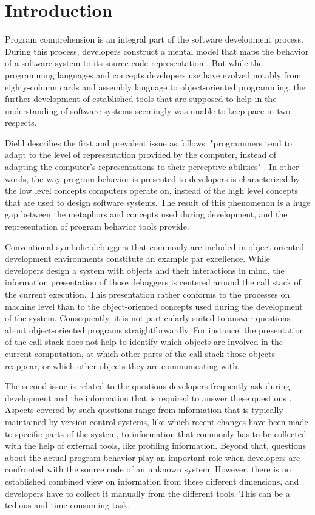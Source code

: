 \chapter{Introduction}
\label{c:introduction}

Program comprehension is an integral part of the software development process.
During this process, developers construct a mental model that maps the behavior of a software system to its source code representation \cite{latoza_maintaining_2006}.
But while the programming languages and concepts developers use have evolved notably from eighty-column cards and assembly language to object-oriented programming, the further development of established tools that are supposed to help in the understanding of software systems seemingly was unable to keep pace in two respects.

Diehl describes the first and prevalent issue as follows: "programmers tend to adapt to the level of representation provided by the computer, instead of adapting the computer's representations to their perceptive abilities" \cite{diehl_software_2007}.
In other words, the way program behavior is presented to developers is characterized by the low level concepts computers operate on, instead of the high level concepts that are used to design software systems.
The result of this phenomenon is a huge gap between the metaphors and concepts used during development, and the representation of program behavior tools provide.

Conventional symbolic debuggers that commonly are included in object-oriented development environments constitute an example par excellence.
While developers design a system with objects and their interactions in mind, the information presentation of those debuggers is centered around the call stack of the current execution.
This presentation rather conforms to the processes on machine level than to the object-oriented concepts used during the development of the system.
Consequently, it is not particularly suited to answer questions about object-oriented programs straightforwardly.
For instance, the presentation of the call stack does not help to identify which objects are involved in the current computation, at which other parts of the call stack those objects reappear, or which other objects they are communicating with.

The second issue is related to the questions developers frequently ask during development and the information that is required to answer these questions \cite{sillito_asking_2008, latoza_hard--answer_2010, abi-antoun_questions_2010}.
Aspects covered by such questions range from information that is typically maintained by version control systems, like which recent changes have been made to specific parts of the system, to information that commonly has to be collected with the help of external tools, like profiling information.
Beyond that, questions about the actual program behavior play an important role when developers are confronted with the source code of an unknown system.
However, there is no established combined view on information from these different dimensions, and developers have to collect it manually from the different tools.
This can be a tedious and time consuming task.

